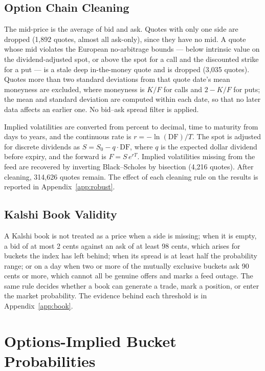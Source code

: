 \documentclass{article}
\begin{document}
\subsection{Option Chain Cleaning}
The mid-price is the average of bid and ask. Quotes with only one side are dropped (1{,}892 quotes, almost all ask-only), since they have no mid. A quote whose mid violates the European no-arbitrage bounds --- below intrinsic value on the dividend-adjusted spot, or above the spot for a call and the discounted strike for a put --- is a stale deep in-the-money quote and is dropped (3{,}035 quotes). Quotes more than two standard deviations from that quote date's mean moneyness are excluded, where moneyness is $K/F$ for calls and $2 - K/F$ for puts; the mean and standard deviation are computed within each date, so that no later data affects an earlier one. No bid--ask spread filter is applied.

Implied volatilities are converted from percent to decimal, time to maturity from days to years, and the continuous rate is $r = -\ln(\mathrm{DF})/T$. The spot is adjusted for discrete dividends as $S = S_0 - q\cdot\mathrm{DF}$, where $q$ is the expected dollar dividend before expiry, and the forward is $F = S\,e^{rT}$. Implied volatilities missing from the feed are recovered by inverting Black--Scholes by bisection \cite{Mayhew1995} (4{,}216 quotes). After cleaning, 314{,}626 quotes remain. The effect of each cleaning rule on the results is reported in Appendix~\ref{app:robust}.

\subsection{Kalshi Book Validity}
A Kalshi book is not treated as a price when a side is missing; when it is empty, a bid of at most 2 cents against an ask of at least 98 cents, which arises for buckets the index has left behind; when its spread is at least half the probability range; or on a day when two or more of the mutually exclusive buckets ask 90 cents or more, which cannot all be genuine offers and marks a feed outage. The same rule decides whether a book can generate a trade, mark a position, or enter the market probability. The evidence behind each threshold is in Appendix~\ref{app:book}.

\section{Options-Implied Bucket Probabilities}\label{sec:density}
\end{document}
